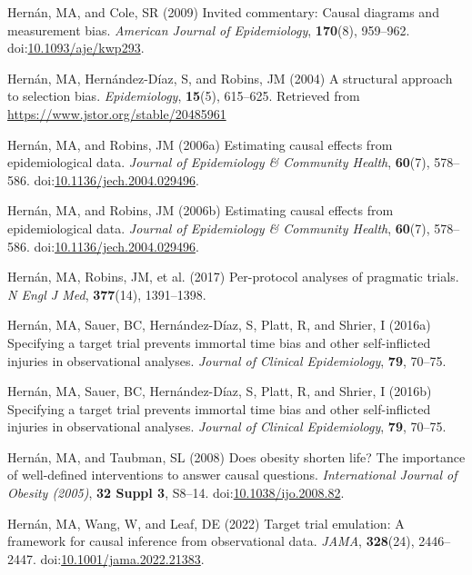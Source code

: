 \documentclass[
  single column]{article}
\newlength{\cslhangindent}
\newenvironment{CSLReferences}[2] %
 {\begin{list}{}{%
  \setlength{\itemindent}{0pt}
  \setlength{\leftmargin}{0pt}
  \setlength{\parsep}{0pt}
  \ifodd #1
   \setlength{\leftmargin}{\cslhangindent}
   \setlength{\itemindent}{-1\cslhangindent}
  \fi
  \setlength{\itemsep}{#2\baselineskip}}}
 {\end{list}}
\begin{document}
\begin{CSLReferences}{1}{0}
Hernán, MA, and Cole, SR (2009) Invited commentary: Causal diagrams and
measurement bias. \emph{American Journal of Epidemiology},
\textbf{170}(8), 959--962.
doi:\href{https://doi.org/10.1093/aje/kwp293}{10.1093/aje/kwp293}.

Hernán, MA, Hernández-Díaz, S, and Robins, JM (2004) A structural
approach to selection bias. \emph{Epidemiology}, \textbf{15}(5),
615--625. Retrieved from \url{https://www.jstor.org/stable/20485961}

Hernán, MA, and Robins, JM (2006a) Estimating causal effects from
epidemiological data. \emph{Journal of Epidemiology \& Community
Health}, \textbf{60}(7), 578--586.
doi:\href{https://doi.org/10.1136/jech.2004.029496}{10.1136/jech.2004.029496}.

Hernán, MA, and Robins, JM (2006b) Estimating causal effects from
epidemiological data. \emph{Journal of Epidemiology \& Community
Health}, \textbf{60}(7), 578--586.
doi:\href{https://doi.org/10.1136/jech.2004.029496}{10.1136/jech.2004.029496}.

Hernán, MA, Robins, JM, et al. (2017) Per-protocol analyses of pragmatic
trials. \emph{N Engl J Med}, \textbf{377}(14), 1391--1398.

Hernán, MA, Sauer, BC, Hernández-Díaz, S, Platt, R, and Shrier, I
(2016a) Specifying a target trial prevents immortal time bias and other
self-inflicted injuries in observational analyses. \emph{Journal of
Clinical Epidemiology}, \textbf{79}, 70--75.

Hernán, MA, Sauer, BC, Hernández-Díaz, S, Platt, R, and Shrier, I
(2016b) Specifying a target trial prevents immortal time bias and other
self-inflicted injuries in observational analyses. \emph{Journal of
Clinical Epidemiology}, \textbf{79}, 70--75.

Hernán, MA, and Taubman, SL (2008) Does obesity shorten life? The
importance of well-defined interventions to answer causal questions.
\emph{International Journal of Obesity (2005)}, \textbf{32 Suppl 3},
S8--14.
doi:\href{https://doi.org/10.1038/ijo.2008.82}{10.1038/ijo.2008.82}.

Hernán, MA, Wang, W, and Leaf, DE (2022) Target trial emulation: A
framework for causal inference from observational data. \emph{JAMA},
\textbf{328}(24), 2446--2447.
doi:\href{https://doi.org/10.1001/jama.2022.21383}{10.1001/jama.2022.21383}.


\end{CSLReferences}
\end{document}
